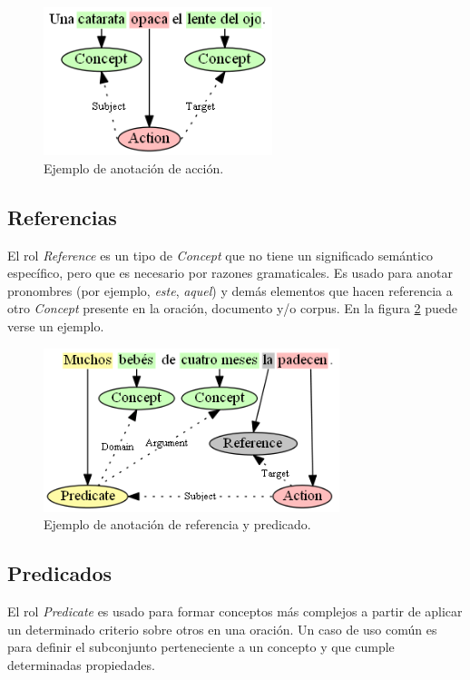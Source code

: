 \begin{figure}[H]
	\begin{center}
		\includegraphics[height=1.7in]{graphics/annotation_example_action.png}
		\caption[Anotación de acción]{Ejemplo de anotación de acción.}
		\label{fig:annotation_example_action}
	\end{center}
\end{figure}

\vspace{-0.4in}
\subsection{Referencias}
El rol \textit{Reference} es un tipo de \textit{Concept} que no tiene un significado semántico específico, pero que es necesario por razones gramaticales. Es usado para anotar pronombres (por ejemplo, \textit{este}, \textit{aquel}) y demás elementos que hacen referencia a otro \textit{Concept} presente en la oración, documento y/o corpus. En la figura \ref{fig:annotation_example_reference_and_predicate} puede verse un ejemplo.

\begin{figure}[H]
	\begin{center}
		\includegraphics[width=3.4in]{graphics/annotation_example_reference_and_predicate.png}
		\caption[Anotación de referencia y predicado]{Ejemplo de anotación de referencia y predicado.}
		\label{fig:annotation_example_reference_and_predicate}
	\end{center}
\end{figure}


\subsection{Predicados}
El rol \textit{Predicate} es usado para formar conceptos más complejos a partir de aplicar un determinado criterio sobre otros en una oración. Un caso de uso común es para definir el subconjunto perteneciente a un concepto y que cumple determinadas propiedades.

